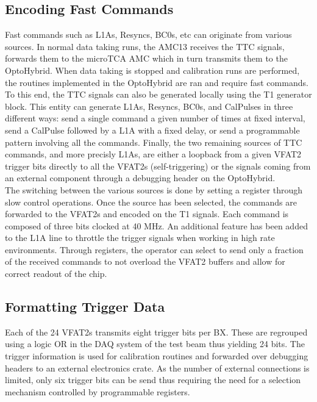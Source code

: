     \subsection{Encoding Fast Commands}

      Fast commands such as L1As, Resyncs, BC0s, etc can originate from various sources. In normal data taking runs, the AMC13 receives the TTC signals, forwards them to the microTCA AMC which in turn transmits them to the OptoHybrid. When data taking is stopped and calibration runs are performed, the routines implemented in the OptoHybrid are ran and require fast commands. To this end, the TTC signals can also be generated locally using the T1 generator block. This entity can generate L1As, Resyncs, BC0s, and CalPulses in three different ways: send a single command a given number of times at fixed interval, send a CalPulse followed by a L1A with a fixed delay, or send a programmable pattern involving all the commands. Finally, the two remaining sources of TTC commands, and more precisly L1As, are either a loopback from a given VFAT2 trigger bits directly to all the VFAT2s (self-triggering) or the signals coming from an external component through a debugging header on the OptoHybrid. \\

      The switching between the various sources is done by setting a register through slow control operations. Once the source has been selected, the commands are forwarded to the VFAT2s and encoded on the T1 signals. Each command is composed of three bits clocked at 40 MHz. An additional feature has been added to the L1A line to throttle the trigger signals when working in high rate environments. Through registers, the operator can select to send only a fraction of the received commands to not overload the VFAT2 buffers and allow for correct readout of the chip.

    \subsection{Formatting Trigger Data}

      Each of the 24 VFAT2s transmits eight trigger bits per BX. These are regrouped using a logic OR in the DAQ system of the test beam  thus yielding 24 bits. The trigger information is used for calibration routines and forwarded over debugging headers to an external electronics crate. As the number of external connections is limited, only six trigger bits can be send thus requiring the need for a selection mechanism controlled by programmable registers.


